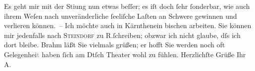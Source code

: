 \begin{ledgroupsized}[t]{13cm}
           Es geht mir mit der Sti{\geminationm}ung nun etwas beſſer; es iſt
               doch ſehr ſonderbar, wie auch \strikeout{\textcolor{gray}{ganz feſtſtehende}} ihrem Weſen nach unveränderliche ſeeliſche Laſten an Schwere gewinnen und
               verlieren können. – Ich möchte auch in Kärnthenein bischen arbeiten. Sie können mir jedenfalls nach \textsc{Steindorf} zu R.ſchreiben; obzwar ich nicht glaube, dſs ich dort
               bleibe.\pend
           \pstart
           Brahm läßt Sie vielmals grüßen; er hofft Sie
               werden noch oft Gelegenhei\textcolor{gray}{t} haben ſich am Dtſch Theater wohl zu fühlen.\pend
           \pstart Herzlichſte Grüße Ihr \spacefill\mbox{A.}\pend{}
         
         \endnumbering{}\end{ledgroupsized}  \newcommand{\dateiname}{L00802}\newcommand{\titel}{Arthur Schnitzler an Hugo von Hofmannsthal, [4. 6. 1898]}\newcommand{\editorInnen}{Martin Anton Müller und Gerd-Hermann Susen}
      